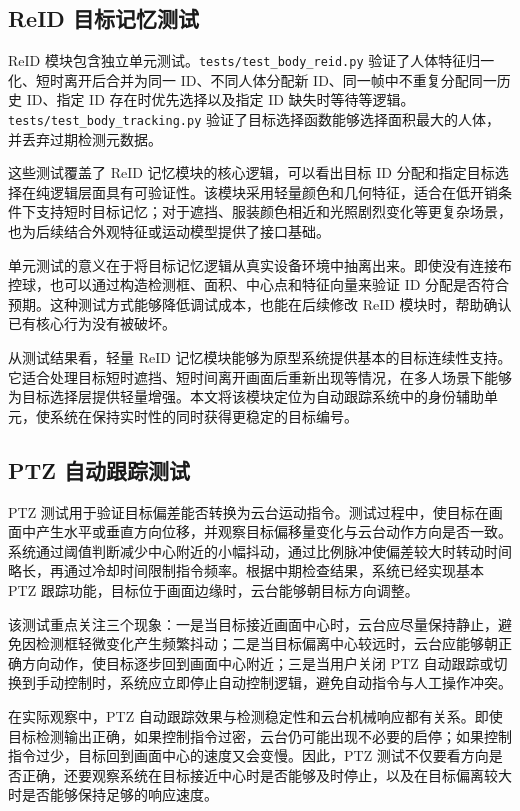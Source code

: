 \subsection{ReID 目标记忆测试}

ReID 模块包含独立单元测试。\texttt{tests/test\_body\_reid.py} 验证了人体特征归一化、短时离开后合并为同一 ID、不同人体分配新 ID、同一帧中不重复分配同一历史 ID、指定 ID 存在时优先选择以及指定 ID 缺失时等待等逻辑。\texttt{tests/test\_body\_tracking.py} 验证了目标选择函数能够选择面积最大的人体，并丢弃过期检测元数据。

这些测试覆盖了 ReID 记忆模块的核心逻辑，可以看出目标 ID 分配和指定目标选择在纯逻辑层面具有可验证性。该模块采用轻量颜色和几何特征，适合在低开销条件下支持短时目标记忆；对于遮挡、服装颜色相近和光照剧烈变化等更复杂场景，也为后续结合外观特征或运动模型提供了接口基础。

单元测试的意义在于将目标记忆逻辑从真实设备环境中抽离出来。即使没有连接布控球，也可以通过构造检测框、面积、中心点和特征向量来验证 ID 分配是否符合预期。这种测试方式能够降低调试成本，也能在后续修改 ReID 模块时，帮助确认已有核心行为没有被破坏。

从测试结果看，轻量 ReID 记忆模块能够为原型系统提供基本的目标连续性支持。它适合处理目标短时遮挡、短时间离开画面后重新出现等情况，在多人场景下能够为目标选择层提供轻量增强。本文将该模块定位为自动跟踪系统中的身份辅助单元，使系统在保持实时性的同时获得更稳定的目标编号。

\subsection{PTZ 自动跟踪测试}

PTZ 测试用于验证目标偏差能否转换为云台运动指令。测试过程中，使目标在画面中产生水平或垂直方向位移，并观察目标偏移量变化与云台动作方向是否一致。系统通过阈值判断减少中心附近的小幅抖动，通过比例脉冲使偏差较大时转动时间略长，再通过冷却时间限制指令频率。根据中期检查结果，系统已经实现基本 PTZ 跟踪功能，目标位于画面边缘时，云台能够朝目标方向调整。

该测试重点关注三个现象：一是当目标接近画面中心时，云台应尽量保持静止，避免因检测框轻微变化产生频繁抖动；二是当目标偏离中心较远时，云台应能够朝正确方向动作，使目标逐步回到画面中心附近；三是当用户关闭 PTZ 自动跟踪或切换到手动控制时，系统应立即停止自动控制逻辑，避免自动指令与人工操作冲突。

在实际观察中，PTZ 自动跟踪效果与检测稳定性和云台机械响应都有关系。即使目标检测输出正确，如果控制指令过密，云台仍可能出现不必要的启停；如果控制指令过少，目标回到画面中心的速度又会变慢。因此，PTZ 测试不仅要看方向是否正确，还要观察系统在目标接近中心时是否能够及时停止，以及在目标偏离较大时是否能够保持足够的响应速度。

